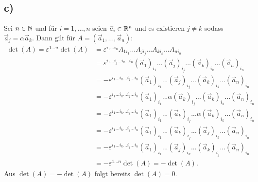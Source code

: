 \documentclass{theozettel}
\renewcommand{\epsilon}{\varepsilon}
\begin{document}
\begin{enumerate}[(F1)]
\subsection*{c)}
Sei $n \in \mathbb{N}$ und für $i = 1,...,n$ seien $\vec{a}_{i} \in \mathbb{R}^{n}$ und es existieren $j \neq k$ sodass $\vec{a}_{j} = \alpha \vec{a}_{k}$. Dann gilt für $A = (\vec{a}_{1},...,\vec{a}_{n})$:
	\begin{align*}
		\det(A) = \epsilon^{1...n} \det(A) &= \epsilon^{i_{1}...i_{n}}A_{1i_{1}}...A_{ji_{j}}...A_{ki_{k}}...A_{ni_{n}} \\
		&= \epsilon^{i_{1}...i_{j}...i_{k}...i_{n}} (\vec{a}_{1})_{i_{1}}...(\vec{a}_{j})_{i_{j}}...(\vec{a}_{k})_{i_{k}}...(\vec{a}_{n})_{i_{n}} \\	
		&= - \epsilon^{i_{1}...i_{k}...i_{j}...i_{n}} (\vec{a}_{1})_{i_{1}}...(\vec{a}_{j})_{i_{j}}...(\vec{a}_{k})_{i_{k}}...(\vec{a}_{n})_{i_{n}} \\	
		&= - \epsilon^{i_{1}...i_{k}...i_{j}...i_{n}} (\vec{a}_{1})_{i_{1}}...\alpha(\vec{a}_{k})_{i_{j}}...(\vec{a}_{k})_{i_{k}}...(\vec{a}_{n})_{i_{n}} \\
		&= - \epsilon^{i_{1}...i_{k}...i_{j}...i_{n}} (\vec{a}_{1})_{i_{1}}...(\vec{a}_{k})_{i_{j}}...\alpha(\vec{a}_{k})_{i_{k}}...(\vec{a}_{n})_{i_{n}} \\
		&= - \epsilon^{i_{1}...i_{k}...i_{j}...i_{n}} (\vec{a}_{1})_{i_{1}}...(\vec{a}_{k})_{i_{j}}...(\vec{a}_{j})_{i_{k}}...(\vec{a}_{n})_{i_{n}} \\
		&= - \epsilon^{i_{1}...i_{k}...i_{j}...i_{n}} (\vec{a}_{1})_{i_{1}}...(\vec{a}_{j})_{i_{k}}...(\vec{a}_{k})_{i_{j}}...(\vec{a}_{n})_{i_{n}} \\
		&= - \epsilon^{1...n}\det(A) = -\det(A).
	\end{align*}
Aus $\det(A) = -\det(A)$ folgt bereits $\det(A) = 0$.
	
\end{enumerate}
	
\end{document}
